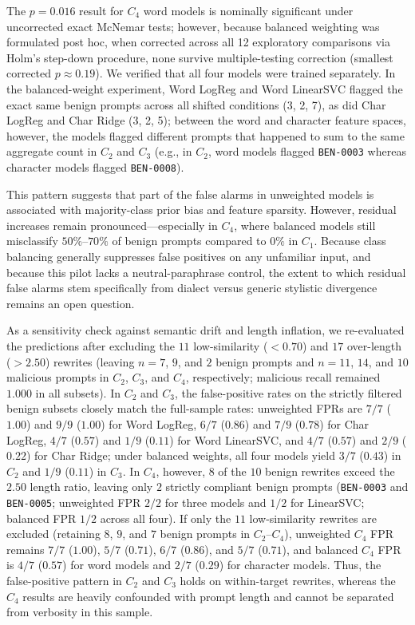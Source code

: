 \documentclass[conference]{IEEEtran}
\begin{document}
The $p = 0.016$ result for $C_4$ word models is nominally significant under uncorrected exact McNemar tests; however, because balanced weighting was formulated post hoc, when corrected across all 12 exploratory comparisons via Holm's step-down procedure, none survive multiple-testing correction (smallest corrected $p \approx 0.19$). We verified that all four models were trained separately. In the balanced-weight experiment, Word LogReg and Word LinearSVC flagged the exact same benign prompts across all shifted conditions (3, 2, 7), as did Char LogReg and Char Ridge (3, 2, 5); between the word and character feature spaces, however, the models flagged different prompts that happened to sum to the same aggregate count in $C_2$ and $C_3$ (e.g., in $C_2$, word models flagged \texttt{BEN-0003} whereas character models flagged \texttt{BEN-0008}).

This pattern suggests that part of the false alarms in unweighted models is associated with majority-class prior bias and feature sparsity. However, residual increases remain pronounced---especially in $C_4$, where balanced models still misclassify $50\%$--$70\%$ of benign prompts compared to $0\%$ in $C_1$. Because class balancing generally suppresses false positives on any unfamiliar input, and because this pilot lacks a neutral-paraphrase control, the extent to which residual false alarms stem specifically from dialect versus generic stylistic divergence remains an open question.

As a sensitivity check against semantic drift and length inflation, we re-evaluated the predictions after excluding the $11$ low-similarity ($< 0.70$) and $17$ over-length ($> 2.50$) rewrites (leaving $n = 7$, $9$, and $2$ benign prompts and $n = 11$, $14$, and $10$ malicious prompts in $C_2$, $C_3$, and $C_4$, respectively; malicious recall remained $1.000$ in all subsets). In $C_2$ and $C_3$, the false-positive rates on the strictly filtered benign subsets closely match the full-sample rates: unweighted FPRs are $7/7$ ($1.00$) and $9/9$ ($1.00$) for Word LogReg, $6/7$ ($0.86$) and $7/9$ ($0.78$) for Char LogReg, $4/7$ ($0.57$) and $1/9$ ($0.11$) for Word LinearSVC, and $4/7$ ($0.57$) and $2/9$ ($0.22$) for Char Ridge; under balanced weights, all four models yield $3/7$ ($0.43$) in $C_2$ and $1/9$ ($0.11$) in $C_3$. In $C_4$, however, $8$ of the $10$ benign rewrites exceed the $2.50$ length ratio, leaving only $2$ strictly compliant benign prompts (\texttt{BEN-0003} and \texttt{BEN-0005}; unweighted FPR $2/2$ for three models and $1/2$ for LinearSVC; balanced FPR $1/2$ across all four). If only the $11$ low-similarity rewrites are excluded (retaining $8$, $9$, and $7$ benign prompts in $C_2$--$C_4$), unweighted $C_4$ FPR remains $7/7$ ($1.00$), $5/7$ ($0.71$), $6/7$ ($0.86$), and $5/7$ ($0.71$), and balanced $C_4$ FPR is $4/7$ ($0.57$) for word models and $2/7$ ($0.29$) for character models. Thus, the false-positive pattern in $C_2$ and $C_3$ holds on within-target rewrites, whereas the $C_4$ results are heavily confounded with prompt length and cannot be separated from verbosity in this sample.
\end{document}
